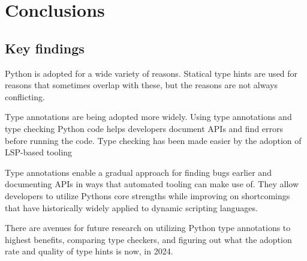 \chapter{Conclusions\label{conclusions}}

\section{Key findings}
Python is adopted for a wide variety of reasons. Statical type hints are used for reasons that sometimes overlap with these, but the reasons are not always conflicting.

Type annotations are being adopted more widely. Using type annotations and type checking Python code helps developers document APIs and find errors before running the code. Type checking has been made easier by the adoption of LSP-based tooling 

Type annotations enable a gradual approach for finding bugs earlier and documenting APIs in ways that automated tooling can make use of. They allow developers to utilize Pythons core strengths while improving on shortcomings that have historically widely applied to dynamic scripting languages.

There are avenues for future research on utilizing Python type annotations to highest benefits, comparing type checkers, and figuring out what the adoption rate and quality of type hints is now, in 2024. 